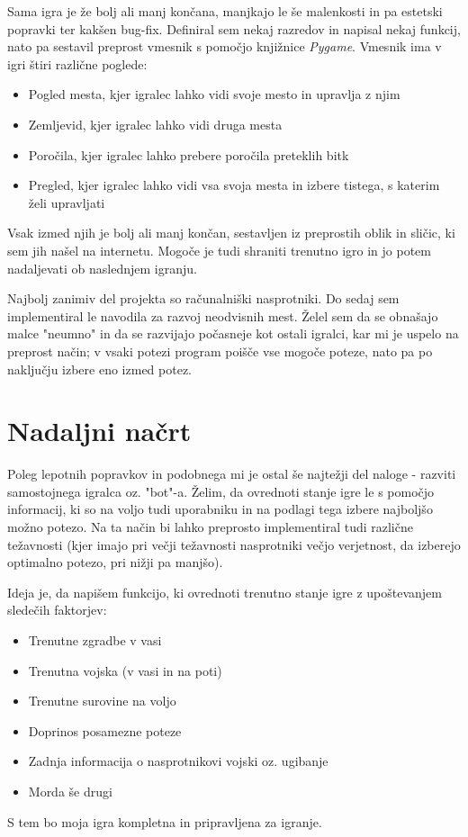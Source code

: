 \documentclass[a4paper, 16pt]{article}
\begin{document}
Sama igra je že bolj ali manj končana, manjkajo le še malenkosti in pa estetski popravki ter kakšen bug-fix. Definiral sem nekaj razredov in napisal nekaj funkcij,
nato pa sestavil preprost vmesnik s pomočjo knjižnice \textit{Pygame}. Vmesnik ima v igri štiri različne poglede:
\begin{itemize}
    \item Pogled mesta, kjer igralec lahko vidi svoje mesto in upravlja z njim
    \item Zemljevid, kjer igralec lahko vidi druga mesta
    \item Poročila, kjer igralec lahko prebere poročila preteklih bitk
    \item Pregled, kjer igralec lahko vidi vsa svoja mesta in izbere tistega, s katerim želi upravljati
\end{itemize}
Vsak izmed njih je bolj ali manj končan, sestavljen iz preprostih oblik in sličic, ki sem jih našel na internetu. Mogoče je tudi shraniti trenutno igro in jo potem nadaljevati
ob naslednjem igranju. 

Najbolj zanimiv del projekta so računalniški nasprotniki. Do sedaj sem implementiral le navodila za razvoj neodvisnih mest. Želel sem da se obnašajo malce "neumno" in 
da se razvijajo počasneje kot ostali igralci, kar mi je uspelo na preprost način; v vsaki potezi program poišče vse mogoče poteze, nato pa po naključju izbere eno izmed potez. 
 

\section{Nadaljni načrt}

Poleg lepotnih popravkov in podobnega mi je ostal še najtežji del naloge - razviti samostojnega igralca oz. "bot"-a. Želim, da ovrednoti stanje igre le s pomočjo informacij, 
ki so na voljo tudi uporabniku in na podlagi tega izbere najboljšo možno potezo. Na ta način bi lahko preprosto implementiral tudi različne težavnosti (kjer imajo pri večji 
težavnosti nasprotniki večjo verjetnost, da izberejo optimalno potezo, pri nižji pa manjšo).

Ideja je, da napišem funkcijo, ki ovrednoti trenutno stanje igre z upoštevanjem sledečih faktorjev:
\begin{itemize}
    \item Trenutne zgradbe v vasi
    \item Trenutna vojska (v vasi in na poti)
    \item Trenutne surovine na voljo
    \item Doprinos posamezne poteze
    \item Zadnja informacija o nasprotnikovi vojski oz. ugibanje
    \item Morda še drugi
\end{itemize}

S tem bo moja igra kompletna in pripravljena za igranje.
\end{document}
